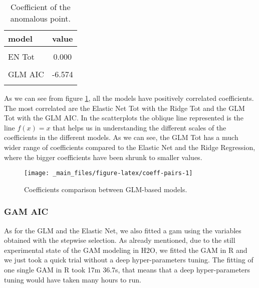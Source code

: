 \documentclass[a4paper, twoside, openright, 12pt]{report}
\theoremstyle{definition}
\theoremstyle{definition}
\theoremstyle{definition}
\theoremstyle{remark}
\begin{document}
\begin{table}[!h]

\caption{\label{tab:anomalous-point}Coefficient of the anomalous point.}
\centering
\begin{tabular}[t]{lc}
\toprule
\textbf{model} & \textbf{value}\\
\midrule[\heavyrulewidth]
\cellcolor{gray!6}{GLM Tot} & \cellcolor{gray!6}{-6.447}\\
EN Tot & 0.000\\
\cellcolor{gray!6}{Ridge Tot} & \cellcolor{gray!6}{-0.003}\\
GLM AIC & -6.574\\
\cellcolor{gray!6}{EN AIC} & \cellcolor{gray!6}{-0.095}\\
\bottomrule
\end{tabular}
\end{table}

As we can see from figure \ref{fig:coeff-pairs}, all the models have positively correlated coefficients. The most correlated are the Elastic Net Tot with the Ridge Tot and the GLM Tot with the GLM AIC. In the scatterplots the oblique line represented is the line \(f(x)=x\) that helps us in understanding the different scales of the coefficients in the different models. As we can see, the GLM Tot has a much wider range of coefficients compared to the Elastic Net and the Ridge Regression, where the bigger coefficients have been shrunk to smaller values.





\begin{figure}[!hbtp]

{\centering \texttt{[image: \_main\_files/figure-latex/coeff-pairs-1]} 

}

\caption[Coefficients comparison between GLM-based models.]{Coefficients comparison between GLM-based models.}\label{fig:coeff-pairs}
\end{figure}

\hypertarget{gam-aic}{%
\subsubsection{GAM AIC}\label{gam-aic}}

As for the GLM and the Elastic Net, we also fitted a gam using the variables obtained with the stepwise selection. As already mentioned, due to the still experimental state of the GAM modeling in H2O, we fitted the GAM in R and we just took a quick trial without a deep hyper-parameters tuning. The fitting of one single GAM in R took 17m 36.7s, that means that a deep hyper-parameters tuning would have taken many hours to run.
\end{document}
